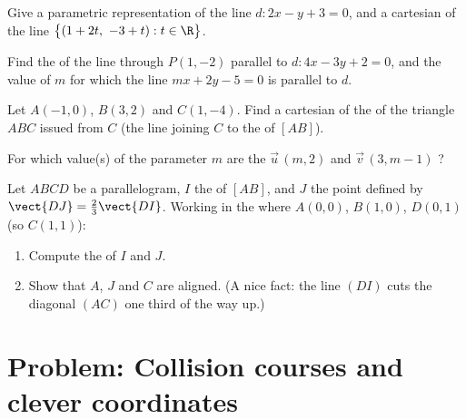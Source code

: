 \begin{exercise}[$\star\star$]\label{exo:g11:vect:7}
Give a parametric representation of the line $d: 2x - y + 3 = 0$, and a
cartesian  of the line
$\bigl\{(1 + 2t,\ -3 + t) : t \in \R\bigr\}$.
\end{exercise}

\begin{exercise}[$\star\star$]\label{exo:g11:vect:8}
Find the  of the line through $P(1, -2)$ parallel to
$d: 4x - 3y + 2 = 0$, and the value of $m$ for which the line
$mx + 2y - 5 = 0$ is parallel to $d$.
\end{exercise}

\begin{exercise}[$\star\star$]\label{exo:g11:vect:9}
Let $A(-1, 0)$, $B(3, 2)$ and $C(1, -4)$. Find a cartesian  of the
\emph{} of the triangle $ABC$ issued from $C$ (the line joining $C$
to the  of $[AB]$).
\end{exercise}

\begin{exercise}[$\star\star$]\label{exo:g11:vect:10}
For which value(s) of the parameter $m$ are the 
$\vec u\,(m, 2)$ and $\vec v\,(3, m - 1)$ ?
\end{exercise}

\begin{exercise}[$\star\star\star$]\label{exo:g11:vect:11}
Let $ABCD$ be a parallelogram, $I$ the  of $[AB]$, and $J$ the
point defined by $\vect{DJ} = \frac23 \vect{DI}$. Working in the
 where $A(0,0)$, $B(1,0)$, $D(0,1)$ (so $C(1,1)$):
\begin{enumerate}
  \item Compute the  of $I$ and $J$.
  \item Show that $A$, $J$ and $C$ are aligned. (A nice fact: the line
        $(DI)$ cuts the diagonal $(AC)$ one third of the way up.)
\end{enumerate}
\end{exercise}

\section{Problem: Collision courses and clever coordinates}

